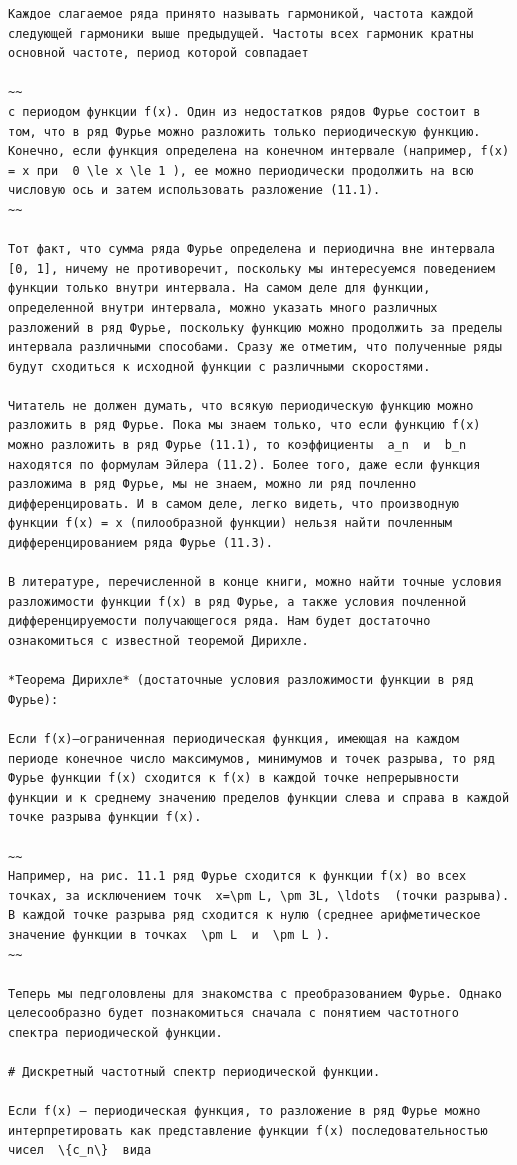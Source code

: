 \documentclass[
  ukrainian,
]{article}
\begin{document}
\begin{verbatim}
Каждое слагаемое ряда принято называть гармоникой, частота каждой следующей гармоники выше предыдущей. Частоты всех гармоник кратны основной частоте, период которой совпадает

~~
с периодом функции f(x). Один из недостатков рядов Фурье состоит в том, что в ряд Фурье можно разложить только периодическую функцию. Конечно, если функция определена на конечном интервале (например, f(x) = x при  0 \le x \le 1 ), ее можно периодически продолжить на всю числовую ось и затем использовать разложение (11.1).
~~

Тот факт, что сумма ряда Фурье определена и периодична вне интервала [0, 1], ничему не противоречит, поскольку мы интересуемся поведением функции только внутри интервала. На самом деле для функции, определенной внутри интервала, можно указать много различных разложений в ряд Фурье, поскольку функцию можно продолжить за пределы интервала различными способами. Сразу же отметим, что полученные ряды будут сходиться к исходной функции с различными скоростями.

Читатель не должен думать, что всякую периодическую функцию можно разложить в ряд Фурье. Пока мы знаем только, что если функцию f(x) можно разложить в ряд Фурье (11.1), то коэффициенты  a_n  и  b_n  находятся по формулам Эйлера (11.2). Более того, даже если функция разложима в ряд Фурье, мы не знаем, можно ли ряд почленно дифференцировать. И в самом деле, легко видеть, что производную функции f(x) = x (пилообразной функции) нельзя найти почленным дифференцированием ряда Фурье (11.3).

В литературе, перечисленной в конце книги, можно найти точные условия разложимости функции f(x) в ряд Фурье, а также условия почленной дифференцируемости получающегося ряда. Нам будет достаточно ознакомиться с известной теоремой Дирихле.

*Теорема Дирихле* (достаточные условия разложимости функции в ряд Фурье):

Если f(x)—ограниченная периодическая функция, имеющая на каждом периоде конечное число максимумов, минимумов и точек разрыва, то ряд Фурье функции f(x) сходится к f(x) в каждой точке непрерывности функции и к среднему значению пределов функции слева и справа в каждой точке разрыва функции f(x).

~~
Например, на рис. 11.1 ряд Фурье сходится к функции f(x) во всех точках, за исключением точк  x=\pm L, \pm 3L, \ldots  (точки разрыва). В каждой точке разрыва ряд сходится к нулю (среднее арифметическое значение функции в точках  \pm L  и  \pm L ).
~~

Теперь мы педголовлены для знакомства с преобразованием Фурье. Однако целесообразно будет познакомиться сначала с понятием частотного спектра периодической функции.

# Дискретный частотный спектр периодической функции.

Если f(x) — периодическая функция, то разложение в ряд Фурье можно интерпретировать как представление функции f(x) последовательностью чисел  \{c_n\}  вида
\end{verbatim}
\end{document}
